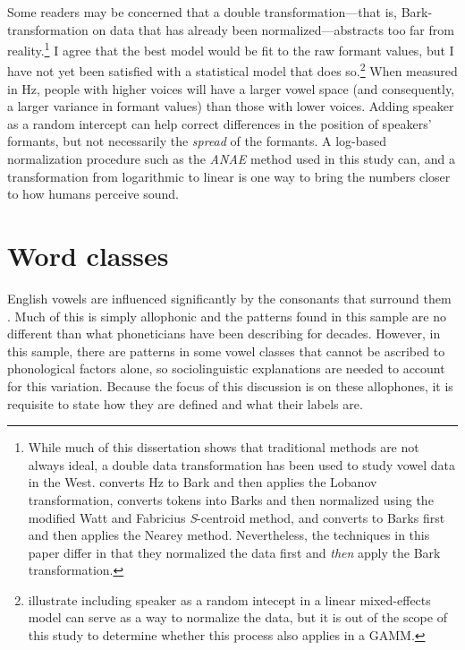Some readers may be concerned that a double transformation---that is, Bark-transformation on data that has already been normalized---abstracts too far from reality.\footnote{While much of this dissertation shows that traditional methods are not always ideal, a double data transformation has been used to study vowel data in the West. \citet[49]{hall_lew_2009_diss} converts Hz to Bark and then applies the Lobanov transformation, \citet[166]{podesva_etal_2015} converts tokens into Barks and then normalized using the modified Watt and Fabricius \textit{S}-centroid method, and \cite[198]{donofrio_etal_2019} converts to Barks first and then applies the Nearey \citeyearpar{nearey_1978_diss} method. Nevertheless, the techniques in this paper differ in that they normalized the data first and \textit{then} apply the Bark transformation.} I agree that the best model would be fit to the raw formant values, but I have not yet been satisfied with a statistical model that does so.\footnote{\citet{drager_hay_2012} illustrate including speaker as a random intecept in a linear mixed-effects model can serve as a way to normalize the data, but it is out of the scope of this study to determine whether this process also applies in a GAMM.} When measured in Hz, people with higher voices will have a larger vowel space (and consequently, a larger variance in formant values) than those with lower voices. Adding speaker as a random intercept can help correct differences in the position of speakers’ formants, but not necessarily the \textit{spread} of the formants. A log-based normalization procedure such as the \textit{ANAE} method used in this study can, and a transformation from logarithmic to linear is one way to bring the numbers closer to how humans perceive sound.





\section{Word classes}
\label{word_classes}

English vowels are influenced significantly by the consonants that surround them \citep{olive_etal_1993}. Much of this is simply allophonic and the patterns found in this sample are no different than what phoneticians have been describing for decades. However, in this sample, there are patterns in some vowel classes that cannot be ascribed to phonological factors alone, so sociolinguistic explanations are needed to account for this variation. Because the focus of this discussion is on these allophones, it is requisite to state how they are defined and what their labels are.

